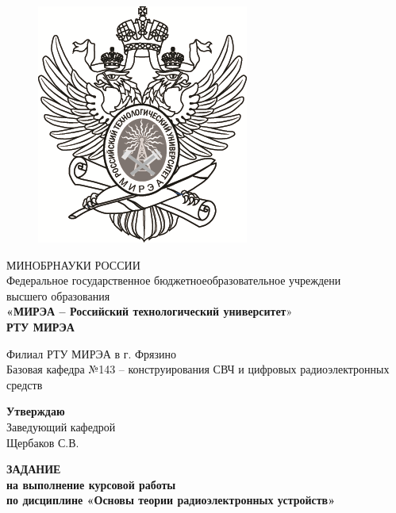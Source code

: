 \begin{center}
\begin{spacing}{1}
    \begin{figure}[H]
        \centering
        \includegraphics{images/titul/1.png} %
    \end{figure}


    \small МИНОБРНАУКИ РОССИИ\\
    \normalsize Федеральное государственное бюджетноеобразовательное учреждени\\
    \normalsize высшего образования\\
    \normalsize \textbf{«МИРЭА – Российский технологический университет}»\\
    \Large\textbf{РТУ МИРЭА}\\
        




    \normalsize  Филиал РТУ МИРЭА в г. Фрязино\\
    \normalsize Базовая кафедра №143 – конструирования СВЧ и цифровых радиоэлектронных средств\\
    
    

    \begin{flushright}
        \small    \textbf{Утверждаю}\\
        \footnotesize    Заведующий кафедрой\\
        \footnotesize    Щербаков С.В.\\
        \footnotesize    \data
    \end{flushright}

    
    
    \large \textbf{ЗАДАНИЕ}\\
    \normalsize \textbf{на выполнение курсовой работы}\\
    \normalsize \textbf{по дисциплине «Основы теории радиоэлектронных устройств»}
    
    
    
    \end{spacing}
\end{center}

